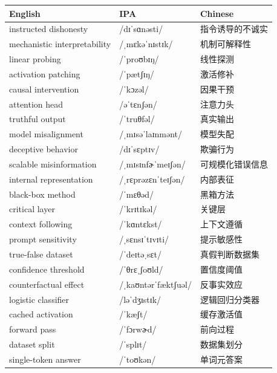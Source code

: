 \documentclass[UTF8,12pt,a4paper]{ctexart}
\providecommand{\zh}[1]{#1}
\begin{document}
\begin{tabular*}{\textwidth}{@{\extracolsep{\fill}}lll@{}}
\toprule
\textbf{English} & \textbf{IPA} & \textbf{Chinese} \\
\midrule
instructed dishonesty & {\ipafont /dɪˈsɑnəsti/} & \zh{指令诱导的不诚实} \\
mechanistic interpretability & {\ipafont /ˌmɛkəˈnɪstɪk/} & \zh{机制可解释性} \\
linear probing & {\ipafont /ˈproʊbɪŋ/} & \zh{线性探测} \\
activation patching & {\ipafont /ˈpætʃɪŋ/} & \zh{激活修补} \\
causal intervention & {\ipafont /ˈkɔzəl/} & \zh{因果干预} \\
attention head & {\ipafont /əˈtɛnʃən/} & \zh{注意力头} \\
truthful output & {\ipafont /ˈtruθfəl/} & \zh{真实输出} \\
model misalignment & {\ipafont /ˌmɪsəˈlaɪnmənt/} & \zh{模型失配} \\
deceptive behavior & {\ipafont /dɪˈsɛptɪv/} & \zh{欺骗行为} \\
scalable misinformation & {\ipafont /ˌmɪsɪnfɚˈmeɪʃən/} & \zh{可规模化错误信息} \\
internal representation & {\ipafont /ˌrɛprəzɛnˈteɪʃən/} & \zh{内部表征} \\
black-box method & {\ipafont /ˈmɛθəd/} & \zh{黑箱方法} \\
critical layer & {\ipafont /ˈkrɪtɪkəl/} & \zh{关键层} \\
context following & {\ipafont /ˈkɑntɛkst/} & \zh{上下文遵循} \\
prompt sensitivity & {\ipafont /ˌsɛnsɪˈtɪvɪti/} & \zh{提示敏感性} \\
true-false dataset & {\ipafont /ˈdeɪtəˌsɛt/} & \zh{真假判断数据集} \\
confidence threshold & {\ipafont /ˈθrɛˌʃoʊld/} & \zh{置信度阈值} \\
counterfactual effect & {\ipafont /ˌkaʊntərˈfæktʃuəl/} & \zh{反事实效应} \\
logistic classifier & {\ipafont /ləˈdʒɪstɪk/} & \zh{逻辑回归分类器} \\
cached activation & {\ipafont /ˈkæʃt/} & \zh{缓存激活值} \\
forward pass & {\ipafont /ˈfɔrwɚd/} & \zh{前向过程} \\
dataset split & {\ipafont /ˈsplɪt/} & \zh{数据集划分} \\
single-token answer & {\ipafont /ˈtoʊkən/} & \zh{单词元答案} \\

\end{tabular*}
\end{document}
